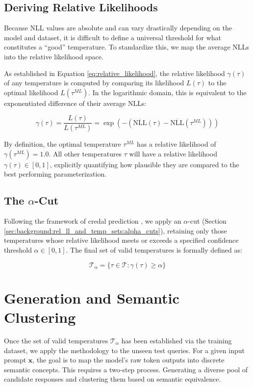 \subsection{Deriving Relative Likelihoods}
\label{sec:methodology:temperature_selection:rel_likelihoods}
Because NLL values are absolute and can vary drastically depending
on the model and dataset, it is difficult to define a universal 
threshold for what constitutes a ``good'' temperature. To standardize
this, we map the average NLLs into the relative likelihood space.

As established in Equation \ref{eq:relative_likelihood},
the relative likelihood $\gamma(\tau)$ of any temperature is computed
by comparing its likelihood $L(\tau)$ to the optimal likelihood 
$L(\tau^{ML})$. In the logarithmic domain, this is equivalent to
the exponentiated difference of their average NLLs:

\begin{equation}
    \gamma(\tau) = \displaystyle\frac{L(\tau)}{L(\tau^{ML})} 
	= \exp \left( - \left( \overline{\text{NLL}}(\tau) 
	- \overline{\text{NLL}}(\tau^{ML}) \right) \right)
    \label{eq:nll_relative_likelihood}
\end{equation}

By definition, the optimal temperature $\tau^{ML}$ has a relative likelihood
of $\gamma(\tau^{ML}) = 1.0$. All other temperatures $\tau$ will
have a relative likelihood $\gamma(\tau) \in [0,1]$, explicitly
quantifying how plausible they are compared to the best performing 
parameterization.

\subsection{The $\alpha$-Cut}
 \label{sec:methodology:temperature_selection:alpha_cut}
Following the framework of credal prediction 
\cite{löhr2025credalpredictionbasedrelative},
we apply an $\alpha$-cut 
(Section \ref{sec:background:rel_ll_and_temp_sets:alpha_cuts}), 
retaining only those temperatures whose
relative likelihood meets or exceeds a specified confidence 
threshold $\alpha \in [0,1]$.
The final set of valid temperatures is formally defined as:

\begin{equation}
    \mathcal{T}_\alpha = \{ \tau \in \mathcal{T} : 
    \gamma(\tau) \geq \alpha \}
    \label{eq:temperature_alpha_cut}
\end{equation}


\section{Generation and Semantic Clustering}
\label{sec:methodology:generation}
Once the set of valid temperatures $\mathcal{T}_\alpha$
has been established via the training dataset, we apply the methodology 
to the unseen test queries. For a given input prompt $\mathbf{x}$, the goal is
to map the model's raw token outputs into discrete semantic concepts.
This requires a two-step process. Generating a diverse pool of 
candidate responses and clustering them based on semantic equivalence.

